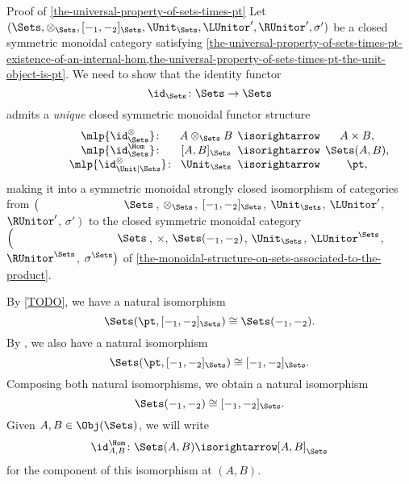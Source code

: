\begin{Proof}{Proof of \cref{the-universal-property-of-sets-times-pt}}%
    Let $(\Sets,\otimes_{\Sets},[-_{1},-_{2}]_{\Sets},\Unit_{\Sets},\LUnitor',\RUnitor',\sigma')$ be a closed symmetric monoidal category satisfying \cref{the-universal-property-of-sets-times-pt-existence-of-an-internal-hom,the-universal-property-of-sets-times-pt-the-unit-object-is-pt}. We need to show that the identity functor
    \[
        \id_{\Sets}%
        \colon%
        \Sets%
        \to%
        \Sets%
    \]%
    admits a \emph{unique} closed symmetric monoidal functor structure
    \[%
        \begin{array}{cccc}
            \phantom{\id^{\otimes}_{\Sets}}\mlp{\id^{\otimes}_{\Sets}}       \colon\mkern-10mu & A\otimes_{\Sets}B \mkern-10mu&{}\mathbin{\isorightarrow}&\mkern-10mu{}A\times B,\\
            \phantom{\id^{\otimes}_{\Sets}}\mlp{\id^{\Hom}_{\Sets}}          \colon\mkern-10mu & [A,B]_{\Sets}     \mkern-10mu&{}\mathbin{\isorightarrow}&\mkern-10mu{}\Sets(A,B),\\
            \phantom{\id^{\otimes}_{\Sets}}\mlp{\id^{\otimes}_{\Unit|\Sets}} \colon\mkern-10mu & \Unit_{\Sets}     \mkern-10mu&{}\mathbin{\isorightarrow}&\mkern-10mu{}\pt,
        \end{array}
    \]%
    making it into a symmetric monoidal strongly closed isomorphism of categories from $\left(\phantom{\mrp{\LUnitor'}}\Sets\right.$, $\otimes_{\Sets}$, $[-_{1},-_{2}]_{\Sets}$, $\Unit_{\Sets}$, $\LUnitor'$, $\RUnitor'$, $\left.\sigma'\right)$ to the closed symmetric monoidal category $\left(\phantom{\mrp{\LUnitor^{\Sets}}}\Sets\right.$, $\times$, $\Sets(-_{1},-_{2})$, $\Unit_{\Sets}$, $\LUnitor^{\Sets}$, $\RUnitor^{\Sets}$, $\left.\sigma^{\Sets}\right)$ of \cref{the-monoidal-structure-on-sets-associated-to-the-product}.

    By \cref{TODO}, we have a natural isomorphism
    \[
        \Sets(\pt,[-_{1},-_{2}]_{\Sets})%
        \cong%
        \Sets(-_{1},-_{2}).%
    \]%
    By , we also have a natural isomorphism
    \[
        \Sets(\pt,[-_{1},-_{2}]_{\Sets})%
        \cong%
        [-_{1},-_{2}]_{\Sets}.%
    \]%
    Composing both natural isomorphisms, we obtain a natural isomorphism
    \[
        \Sets(-_{1},-_{2})%
        \cong%
        [-_{1},-_{2}]_{\Sets}.%
    \]%
    Given $A,B\in\Obj(\Sets)$, we will write
    \[
        \id^{\Hom}_{A,B}%
        \colon%
        \Sets(A,B)%
        \isorightarrow%
        [A,B]_{\Sets}%
    \]%
    for the component of this isomorphism at $(A,B)$.


\end{Proof}
